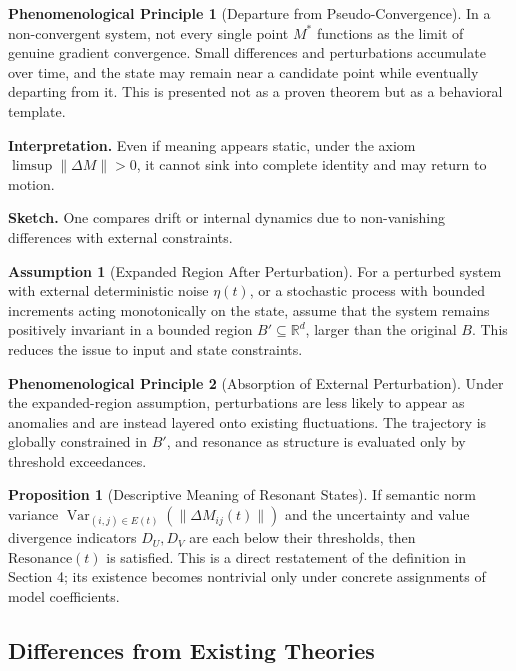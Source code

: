\documentclass[11pt,a4paper]{article}
\theoremstyle{definition}
\newtheorem{proposition}{Proposition}[section]
\newtheorem{assumption}{Assumption}[section]
\newtheorem{phenomenological}{Phenomenological Principle}[section]
\begin{document}
\begin{phenomenological}[Departure from Pseudo-Convergence]
In a non-convergent system, not every single point $M^*$ functions as the limit of genuine gradient convergence. Small differences and perturbations accumulate over time, and the state may remain near a candidate point while eventually departing from it. This is presented not as a proven theorem but as a behavioral template.

\textbf{Interpretation.} Even if meaning appears static, under the axiom $\limsup \|\Delta M\| > 0$, it cannot sink into complete identity and may return to motion.

\textbf{Sketch.} One compares drift or internal dynamics due to non-vanishing differences with external constraints.
\end{phenomenological}

\begin{assumption}[Expanded Region After Perturbation]
For a perturbed system with external deterministic noise $\eta(t)$, or a stochastic process with bounded increments acting monotonically on the state, assume that the system remains positively invariant in a bounded region $B' \subseteq \mathbb{R}^d$, larger than the original $B$. This reduces the issue to input and state constraints.
\end{assumption}

\begin{phenomenological}[Absorption of External Perturbation]
Under the expanded-region assumption, perturbations are less likely to appear as anomalies and are instead layered onto existing fluctuations. The trajectory is globally constrained in $B'$, and resonance as structure is evaluated only by threshold exceedances.
\end{phenomenological}

\begin{proposition}[Descriptive Meaning of Resonant States]
If semantic norm variance $\operatorname{Var}_{(i,j)\in E(t)}(\|\Delta M_{ij}(t)\|)$ and the uncertainty and value divergence indicators $D_U, D_V$ are each below their thresholds, then $\mathrm{Resonance}(t)$ is satisfied. This is a direct restatement of the definition in Section 4; its existence becomes nontrivial only under concrete assignments of model coefficients.
\end{proposition}

\subsection{Differences from Existing Theories}
\end{document}

